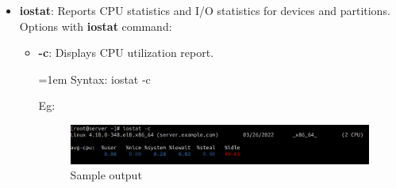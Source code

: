\begin{flushleft}
\begin{itemize}
	\item \textbf{iostat}: Reports CPU statistics and I/O statistics for devices and partitions.
	\newline
	Options with \textbf{iostat} command:
	\begin{itemize}
		\item \textbf{-c}: Displays CPU utilization report.
		\bigskip
		\begin{tcolorbox}[breakable,notitle,boxrule=0pt,colback=pink,colframe=pink]
			\color{black}
			\font=1em
			Syntax: iostat -c
			\font=4pt
		\end{tcolorbox}
		Eg:
		\begin{figure}[h!]
			\centering
			\includegraphics[scale=0.2]{content/chapter15/images/iostat.png}
			\caption{Sample output}
			\label{fig:output}
		\end{figure}
		

\end{itemize}
\end{itemize}
\end{flushleft}
